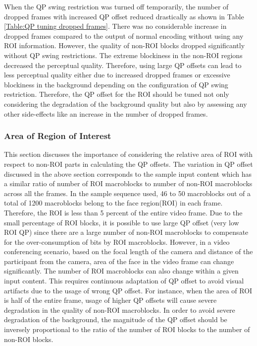 \documentclass[11pt]{article} %
\begin{document}
When the QP swing restriction was turned off temporarily, the number of dropped frames with increased QP offset reduced drastically as shown in Table \ref{Table:QP tuning dropped frames}. There was no considerable increase in dropped frames compared to the output of normal encoding without using any ROI information. However, the quality of non-ROI blocks dropped significantly without QP swing restrictions. The extreme blockiness in the non-ROI regions decreased the perceptual quality. Therefore, using large QP offsets can lead to less perceptual quality either due to increased dropped frames or excessive blockiness in the background depending on the configuration of QP swing restriction. Therefore, the QP offset for the ROI should be tuned not only considering the degradation of the background quality but also by assessing any other side-effects like an increase in the number of dropped frames.
%
\subsubsection{Area of Region of Interest}
This section discusses the importance of considering the relative area of ROI with respect to non-ROI parts in calculating the QP offsets. The variation in QP offset discussed in the above section corresponds to the sample input content which has a similar ratio of number of ROI macroblocks to number of non-ROI macroblocks across all the frames. In the sample sequence used, 46 to 50 macroblocks out of a total of 1200 macroblocks belong to the face region(ROI) in each frame. Therefore, the ROI is less than 5 percent of the entire video frame. Due to the small percentage of ROI blocks, it is possible to use large QP offset (very low ROI QP) since there are a large number of non-ROI macroblocks to compensate for the over-consumption of bits by ROI macroblocks. However, in a video conferencing scenario,  based on the focal length of the camera and distance of the participant from the camera, area of the face in the video frame can change significantly. The number of ROI macroblocks can also change within a given input content. This requires continuous adaptation of QP offset to avoid visual artifacts due to the usage of wrong QP offset. For instance, when the area of ROI is half of the entire frame, usage of higher QP offsets will cause severe degradation in the quality of non-ROI macroblocks. In order to avoid severe degradation of the background, the magnitude of the QP offset should be inversely proportional to the ratio of the number of ROI blocks to the number of non-ROI blocks.
\end{document}

